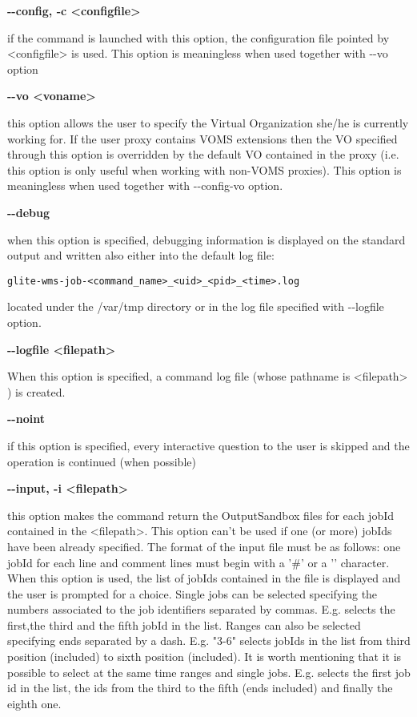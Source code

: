 \textbf{-{}-config, -c <configfile>}

if the command is launched with this option, the configuration file pointed by <configfile> is used. This option is meaningless when used together with -{}-vo option




\textbf{-{}-vo <voname>}

this option allows the user to specify the Virtual Organization she/he is currently working for.
If the user proxy contains VOMS extensions then the VO specified through this option is overridden by the
default VO contained in the proxy (i.e. this option is only useful when working with non-VOMS proxies).
This option is meaningless when used together with -{}-config-vo option.




\textbf{-{}-debug}

when this option is specified, debugging information is displayed on the standard output and written also either into the default log file:


\begin{verbatim}
glite-wms-job-<command_name>_<uid>_<pid>_<time>.log
\end{verbatim}

located under the /var/tmp  directory or in the log file specified with -{}-logfile option.




\textbf{-{}-logfile <filepath>}

When this option is specified, a command log file (whose pathname is <filepath> ) is created.



\textbf{-{}-noint}

if this option is specified, every interactive question to the user is skipped and the operation is continued (when possible)





\textbf{-{}-input, -i <filepath>}

this option makes the command return the OutputSandbox files for each jobId contained in the <filepath>. 
This option can't be used if one (or more) jobIds have been already specified. 
The format of the input file must be as follows: one jobId for each line and comment lines must begin with a 
'\#' or a '\*' character. When this option is used, the list of jobIds contained in the file is displayed and 
the user is prompted for a choice. Single jobs can be selected specifying the numbers associated to the job 
identifiers separated by commas.
E.g. selects the first,the third and the fifth jobId in the list. Ranges can also be selected specifying 
ends separated by a dash. E.g. "3-6" selects jobIds in the list from third position (included) to sixth position 
(included). It is worth mentioning that it is possible to select at the same time ranges and single jobs.
E.g. selects the first job id in the list, the ids from the third to the fifth (ends included) and finally 
the eighth one.





